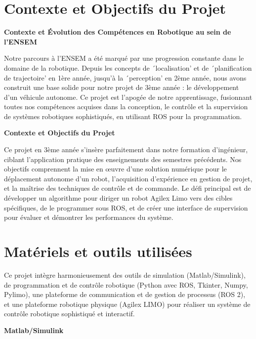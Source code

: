 








\section{Contexte et Objectifs du Projet}


\textbf{Contexte et Évolution des Compétences en Robotique au sein de l'ENSEM}

Notre parcours à l'ENSEM a été marqué par une progression constante dans le domaine de la robotique. Depuis les concepts de ´localisation' et de ´planification de trajectoire' en 1ère année, jusqu'à la ´perception' en 2ème année, nous avons construit une base solide pour notre projet de 3ème année : le développement d'un véhicule autonome. Ce projet est l'apogée de notre apprentissage, fusionnant toutes nos compétences acquises dans la conception, le contrôle et la supervision de systèmes robotiques sophistiqués, en utilisant ROS pour la programmation.

\textbf{Contexte et Objectifs du Projet}

Ce projet en 3ème année s'insère parfaitement dans notre formation d'ingénieur, ciblant l'application pratique des enseignements des semestres précédents. Nos objectifs comprennent la mise en œuvre d'une solution numérique pour le déplacement autonome d'un robot, l'acquisition d'expérience en gestion de projet, et la maîtrise des techniques de contrôle et de commande. Le défi principal est de développer un algorithme pour diriger un robot Agilex Limo vers des cibles spécifiques, de le programmer sous ROS, et de créer une interface de supervision pour évaluer et démontrer les performances du système.


\section{Matériels et outils utilisées}

Ce projet intègre harmonieusement des outils de simulation (Matlab/Simulink), de programmation et de contrôle robotique (Python avec ROS, Tkinter, Numpy, Pylimo), une plateforme de communication et de gestion de processus (ROS 2), et une plateforme robotique physique (Agilex LIMO) pour réaliser un système de contrôle robotique sophistiqué et interactif.

\textbf{Matlab/Simulink}

